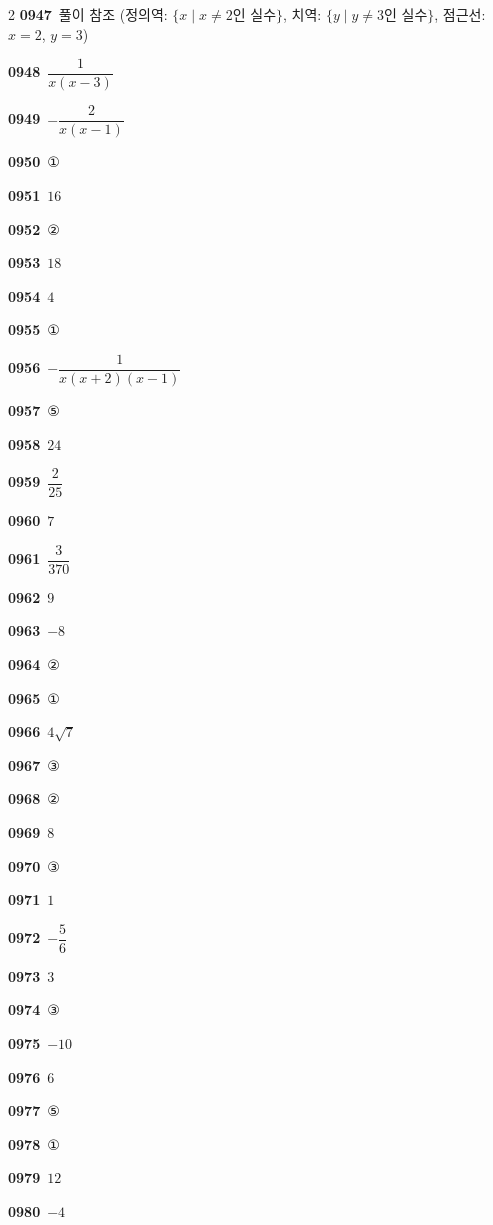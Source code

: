 \documentclass[10pt,a4paper]{article}
\begin{document}
\begin{multicols}{2}
\noindent\textbf{0947}\ 풀이 참조 (정의역: $\{x \mid x\ne 2$인 실수$\}$, 치역: $\{y \mid y\ne 3$인 실수$\}$, 점근선: $x=2$, $y=3$)\par
\noindent\textbf{0948}\ $\dfrac{1}{x(x-3)}$\par
\noindent\textbf{0949}\ $-\dfrac{2}{x(x-1)}$\par
\noindent\textbf{0950}\ ①\par
\noindent\textbf{0951}\ $16$\par
\noindent\textbf{0952}\ ②\par
\noindent\textbf{0953}\ $18$\par
\noindent\textbf{0954}\ $4$\par
\noindent\textbf{0955}\ ①\par
\noindent\textbf{0956}\ $-\dfrac{1}{x(x+2)(x-1)}$\par
\noindent\textbf{0957}\ ⑤\par
\noindent\textbf{0958}\ $24$\par
\noindent\textbf{0959}\ $\dfrac{2}{25}$\par
\noindent\textbf{0960}\ $7$\par
\noindent\textbf{0961}\ $\dfrac{3}{370}$\par
\noindent\textbf{0962}\ $9$\par
\noindent\textbf{0963}\ $-8$\par
\noindent\textbf{0964}\ ②\par
\noindent\textbf{0965}\ ①\par
\noindent\textbf{0966}\ $4\sqrt{7}$\par
\noindent\textbf{0967}\ ③\par
\noindent\textbf{0968}\ ②\par
\noindent\textbf{0969}\ $8$\par
\noindent\textbf{0970}\ ③\par
\noindent\textbf{0971}\ $1$\par
\noindent\textbf{0972}\ $-\dfrac{5}{6}$\par
\noindent\textbf{0973}\ $3$\par
\noindent\textbf{0974}\ ③\par
\noindent\textbf{0975}\ $-10$\par
\noindent\textbf{0976}\ $6$\par
\noindent\textbf{0977}\ ⑤\par
\noindent\textbf{0978}\ ①\par
\noindent\textbf{0979}\ $12$\par
\noindent\textbf{0980}\ $-4$\par

\end{multicols}
\end{document}
